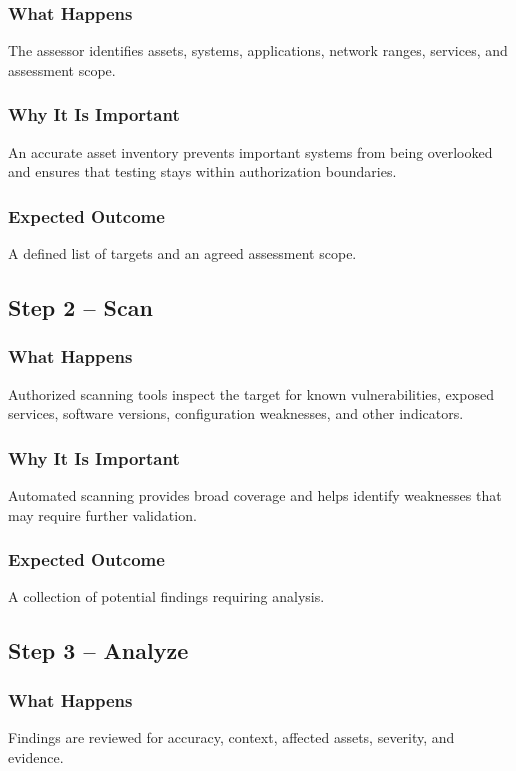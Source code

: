 \documentclass[11pt,a4paper]{article}
\begin{document}
\subsubsection{What Happens}
The assessor identifies assets, systems, applications, network ranges, services, and assessment scope.

\subsubsection{Why It Is Important}
An accurate asset inventory prevents important systems from being overlooked and ensures that testing stays within authorization boundaries.

\subsubsection{Expected Outcome}
A defined list of targets and an agreed assessment scope.


\subsection{Step 2 – Scan}
\subsubsection{What Happens}
Authorized scanning tools inspect the target for known vulnerabilities, exposed services, software versions, configuration weaknesses, and other indicators.

\subsubsection{Why It Is Important}
Automated scanning provides broad coverage and helps identify weaknesses that may require further validation.

\subsubsection{Expected Outcome}
A collection of potential findings requiring analysis.

\subsection{Step 3 – Analyze}
\subsubsection{What Happens}
Findings are reviewed for accuracy, context, affected assets, severity, and evidence.
\end{document}
